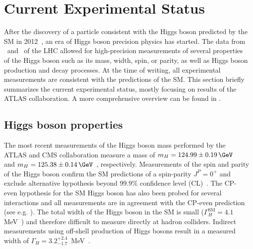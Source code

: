 \section{Current Experimental Status}
\label{subsec:higgs-exp-status}
After the discovery of a particle consistent with the Higgs boson predicted by the SM in 2012~\cite{HIGG-2012-27,CMS-HIG-12-028}, an era of Higgs boson precision physics has started.
The data from \RunOne\ and \RunTwo\ of the LHC allowed for high-precision measurements of several properties of the Higgs boson such as its mass, width, spin, or parity, as well as Higgs boson production and decay processes. 
At the time of writing, all experimental measurements are consistent with the predictions of the SM.
This section briefly summarizes the current experimental status, mostly focusing on results of the ATLAS collaboration. A more comprehensive overview can be found in . 

\subsection{Higgs boson properties}
The most recent measurements of the Higgs boson mass performed by the ATLAS and CMS collaboration measure a mass of $m_H = 124.99 \pm 0.19\,\GeV$~\cite{https://doi.org/10.48550/arxiv.2207.00320} and $m_H = 125.38 \pm 0.14\,\GeV$~\cite{Sirunyan_2020mass}, respectively.
Measurements of the spin and parity of the Higgs boson confirm the SM predictions of a spin-parity $J^{P} = 0^{+}$ and exclude alternative hypothesis beyond 99.9\% confidence level (CL)~\cite{HIGG-2013-17-witherratum,CMS-HIG-14-018}.
The CP-even hypothesis for the SM Higgs boson has also been probed for several interactions and all measurements are in agreement with the CP-even prediction (see e.g. ).
The total width of the Higgs boson in the SM is small ($\Gamma_H^{\text{SM}} = 4.1\,$ MeV~\cite{deFlorian:2016spz}) and therefore difficult to measure directly at hadron colliders. Indirect measurements using off-shell production of Higgs bosons result in a measured width of $\Gamma_H = 3.2 ^{+2.4}_{-1.7}\,$ MeV~\cite{https://doi.org/10.48550/arxiv.2202.06923}.

